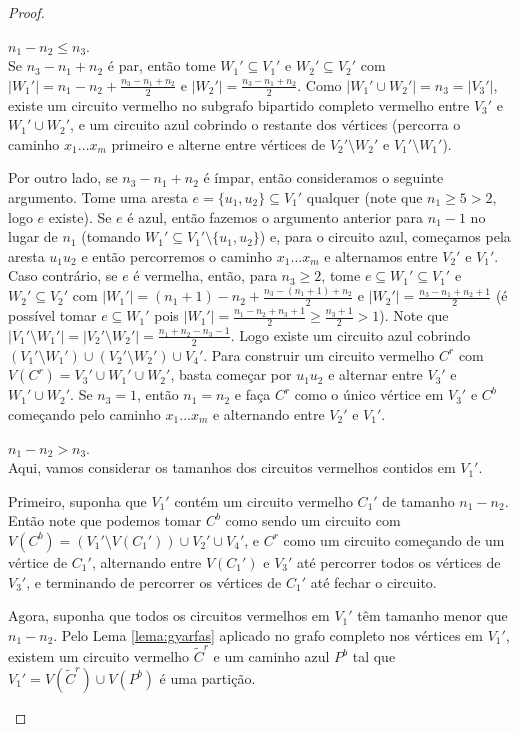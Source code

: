\begin{proof}
	\begin{caso}
		$n_1 - n_2\leq n_3$.\\		
		Se $n_3 - n_1 + n_2$ é par, então tome $W_1'\subseteq V_1'$ e $W_2'\subseteq V_2'$ com $|W_1'| = n_1 - n_2 + \frac{n_3 - n_1 + n_2}{2}$ e $|W_2'| = \frac{n_3 - n_1 + n_2}{2}$. Como $|W_1'\cup W_2'| = n_3 = |V_3'|$, existe um circuito vermelho no subgrafo bipartido completo vermelho entre $V_3'$ e $W_1'\cup W_2'$, e um circuito azul cobrindo o restante dos vértices (percorra o caminho $x_1\dots x_m$ primeiro e alterne entre vértices de $V_2'\setminus W_2'$ e $V_1'\setminus W_1'$).
		
		Por outro lado, se $n_3 - n_1 + n_2$ é ímpar, então consideramos o seguinte argumento. Tome uma aresta $e = \{u_1, u_2\}\subseteq V_1'$ qualquer (note que $n_1\geq5>2$, logo $e$ existe). Se $e$ é azul, então fazemos o argumento anterior para $n_1-1$ no lugar de $n_1$ (tomando $W_1'\subseteq V_1'\setminus\{u_1, u_2\}$) e, para o circuito azul, começamos pela aresta $u_1u_2$ e então percorremos o caminho $x_1\dots x_m$ e alternamos entre $V_2'$ e $V_1'$.
		Caso contrário, se $e$ é vermelha, então, para $n_3\geq2$, tome $e\subseteq W_1'\subseteq V_1'$ e $W_2'\subseteq V_2'$ com $|W_1'| = (n_1 + 1) - n_2 + \frac{n_3 - (n_1+1) + n_2}{2}$ e $|W_2'| = \frac{n_3 - n_1 + n_2 + 1}{2}$ (é possível tomar $e\subseteq W_1'$ pois $|W_1'| = \frac{n_1 - n_2 + n_3 + 1}{2}\geq \frac{n_3 + 1}{2}>1$). Note que $|V_1'\setminus W_1'| = |V_2'\setminus W_2'| = \frac{n_1 + n_2 - n_3 - 1}{2}$. Logo existe um circuito azul cobrindo $(V_1'\setminus W_1')\cup(V_2'\setminus W_2')\cup V_4'$. Para construir um circuito vermelho $C^r$ com $V(C^r) = V_3'\cup W_1' \cup W_2'$, basta começar por $u_1u_2$ e alternar entre $V_3'$ e $W_1'\cup W_2'$. Se $n_3 = 1$, então $n_1 = n_2$ e faça $C^r$ como o único vértice em $V_3'$ e $C^b$ começando pelo caminho $x_1\dots x_m$ e alternando entre $V_2'$ e $V_1'$.
	\end{caso} 
	\begin{caso}
		$n_1 - n_2 > n_3$.\\
		Aqui, vamos considerar os tamanhos dos circuitos vermelhos contidos em $V_1'$.
		
		Primeiro, suponha que $V_1'$ contém um circuito vermelho $C_1'$ de tamanho $n_1 - n_2$. Então note que podemos tomar $C^b$ como sendo um circuito com $V(C^b) = (V_1'\setminus V(C_1'))\cup V_2'\cup V_4'$, e $C^r$ como um circuito começando de um vértice de $C_1'$, alternando entre $V(C_1')$ e $V_3'$ até percorrer todos os vértices de $V_3'$, e terminando de percorrer os vértices de $C_1'$ até fechar o circuito.
		
		Agora, suponha que todos os circuitos vermelhos em $V_1'$ têm tamanho menor que $n_1 - n_2$. Pelo Lema \ref{lema:gyarfas} aplicado no grafo completo nos vértices em $V_1'$, existem um circuito vermelho $\tilde{C}^r$ e um caminho azul $P^b$ tal que $V_1' = V(\tilde{C}^r)\cup V(P^b)$ é uma partição. 
	\end{caso}
	
	\qedhere
\end{proof}

